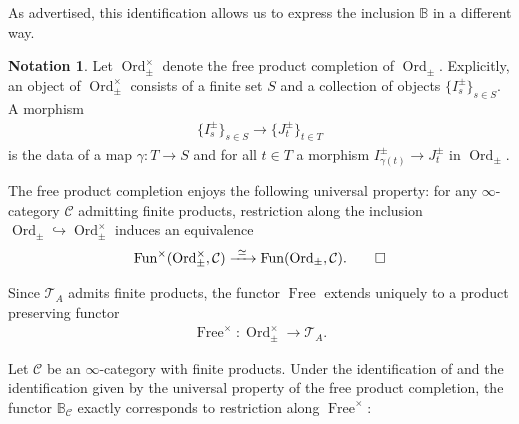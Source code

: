 \documentclass[12pt, reqno]{amsart}
\theoremstyle{plain}
\theoremstyle{definition}
\newtheorem{notation}[theorem]{Notation}
\begin{document}
As advertised, this identification allows us to express the inclusion $\mathbb{B}$ in a different way.

\begin{notation}
Let $\operatorname{Ord}_\pm^\times$ denote the free product completion of $\operatorname{Ord}_\pm$. Explicitly, an object of $\operatorname{Ord}_\pm^\times$ consists of a finite set $S$ and a collection of objects $\{I_s^\pm\}_{s\in S}$. A morphism
\begin{align*}
\{I_s^\pm\}_{s\in S}\rightarrow \{J_t^\pm\}_{t\in T}
\end{align*}
is the data of a map $\gamma\colon T\rightarrow S$ and for all $t\in T$ a morphism $I_{\gamma(t)}^\pm \rightarrow J_t^\pm$ in $\operatorname{Ord}_\pm$.

The free product completion enjoys the following universal property: for any $\infty$-category $\mathcal{C}$ admitting finite products, restriction along the inclusion $\operatorname{Ord}_\pm\hookrightarrow \operatorname{Ord}_\pm^\times$ induces an equivalence
\begin{equation*}
\operatorname{Fun}^\times(\operatorname{Ord}_\pm^\times,\mathcal{C})\xrightarrow{\ \simeq\ }\operatorname{Fun}(\operatorname{Ord}_\pm,\mathcal{C}).\qedhere
\end{equation*}
\end{notation}

Since $\mathcal{T}_A$ admits finite products, the functor $\operatorname{Free}$ extends uniquely to a product preserving functor
\begin{align*}
\operatorname{Free}^\times\colon \operatorname{Ord}_\pm^\times\rightarrow \mathcal{T}_A.
\end{align*}

Let $\mathcal{C}$ be an $\infty$-category with finite products. Under the identification of  and the identification given by the universal property of the free product completion, the functor $\mathbb{B}_\mathcal{C}$ exactly corresponds to restriction along $\operatorname{Free}^\times$:
\begin{center}
\end{center}
\end{document}
